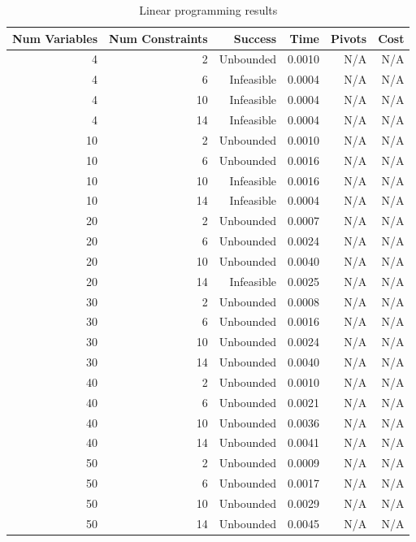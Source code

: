 \begin{table}[ht]
    \centering
    \begin{tabular}{rrrrrr}
        \toprule
        Num Variables & Num Constraints & Success & Time & Pivots & Cost \\
        \midrule
        4 & 2 & Unbounded & 0.0010 & N/A & N/A \\
		4 & 6 & Infeasible & 0.0004 & N/A & N/A \\
		4 & 10 & Infeasible & 0.0004 & N/A & N/A \\
		4 & 14 & Infeasible & 0.0004 & N/A & N/A \\
		10 & 2 & Unbounded & 0.0010 & N/A & N/A \\
		10 & 6 & Unbounded & 0.0016 & N/A & N/A \\
		10 & 10 & Infeasible & 0.0016 & N/A & N/A \\
		10 & 14 & Infeasible & 0.0004 & N/A & N/A \\
		20 & 2 & Unbounded & 0.0007 & N/A & N/A \\
		20 & 6 & Unbounded & 0.0024 & N/A & N/A \\
		20 & 10 & Unbounded & 0.0040 & N/A & N/A \\
		20 & 14 & Infeasible & 0.0025 & N/A & N/A \\
		30 & 2 & Unbounded & 0.0008 & N/A & N/A \\
		30 & 6 & Unbounded & 0.0016 & N/A & N/A \\
		30 & 10 & Unbounded & 0.0024 & N/A & N/A \\
		30 & 14 & Unbounded & 0.0040 & N/A & N/A \\
		40 & 2 & Unbounded & 0.0010 & N/A & N/A \\
		40 & 6 & Unbounded & 0.0021 & N/A & N/A \\
		40 & 10 & Unbounded & 0.0036 & N/A & N/A \\
		40 & 14 & Unbounded & 0.0041 & N/A & N/A \\
		50 & 2 & Unbounded & 0.0009 & N/A & N/A \\
		50 & 6 & Unbounded & 0.0017 & N/A & N/A \\
		50 & 10 & Unbounded & 0.0029 & N/A & N/A \\
		50 & 14 & Unbounded & 0.0045 & N/A & N/A \\
        \bottomrule
    \end{tabular}
    \caption{Linear programming results}
    \label{tab:lp-results}
\end{table}